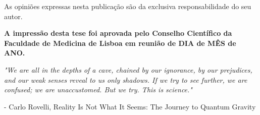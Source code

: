 \documentclass[12pt,a4paper,twoside,openright]{book}
\makeatletter
\def\blankpage{%
      \clearpage%
      \thispagestyle{empty}%
      \null%
      \clearpage}
\def\cleardoublepage{\clearpage\if@twoside \ifodd\c@page\else
    \hbox{}
    \thispagestyle{plain}
    \newpage
    \if@twocolumn\hbox{}\newpage\fi\fi\fi}
\makeatother
\begin{document}
\begin{sloppy}
\frontmatter


\clearpage \thispagestyle{empty}\mbox{}\clearpage


\clearpage \thispagestyle{empty}\mbox{}\clearpage

\newpage
\thispagestyle{empty}
\vspace*{\fill}
\begin{center}
    \vspace*{\fill}
    As opiniões expressas nesta publicação são da exclusiva responsabilidade do seu autor. \\
    
    \vspace*{2cm}
    
    \begingroup
        \fontsize{14pt}{12pt}\selectfont
        \textbf{A impressão desta tese foi aprovada pelo Conselho Científico da Faculdade de Medicina de Lisboa em reunião de DIA de MÊS de ANO.}
    \endgroup
\end{center}
\blankpage

\newpage
\thispagestyle{empty}
\vspace*{3cm}
\begin{center}
\emph{"We are all in the depths of a cave, chained by our ignorance, by our prejudices, and our weak senses reveal to us only shadows. If we try to see further, we are confused; we are unaccustomed. But we try. This is science."} \\
\end{center} 
\begin{flushright}- Carlo Rovelli, Reality Is Not What It Seems: The Journey to Quantum Gravity\end{flushright}
\clearpage \thispagestyle{empty}\mbox{}\clearpage
\cleardoublepage

\newpage
\thispagestyle{plain}

\end{sloppy}
\end{document}

